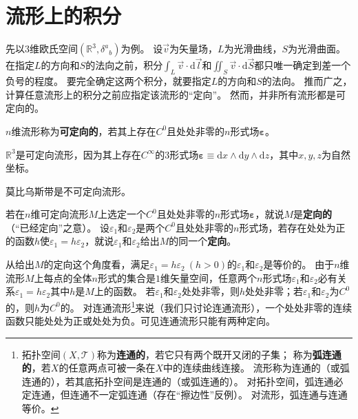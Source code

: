 \section{流形上的积分}

先以$3$维欧氏空间$(\mathbb{R}^3, \delta^a{}_{b})$为例。
设$\vec{v}$为矢量场，$L$为光滑曲线，$S$为光滑曲面。
在指定$L$的方向和$S$的法向之前，积分$\displaystyle\int_L\vec{v}\cdot\mathrm{d}\vec{l}$和$\displaystyle\iint_S\vec{v}\cdot\mathrm{d}\vec{S}$都只唯一确定到差一个负号的程度。
要完全确定这两个积分，就要指定$L$的方向和$S$的法向。
推而广之，计算任意流形上的积分之前应指定该流形的``定向''。
然而，并非所有流形都是可定向的。

\begin{definition}
    $n$维流形称为\textbf{可定向的}，若其上存在$C^0$且处处非零的$n$形式场$\bm\varepsilon$。
\end{definition}

\begin{example}
    $\mathbb{R}^3$是可定向流形，因为其上存在$C^\infty$的$3$形式场$\bm\varepsilon \equiv \mathrm{d}x \wedge \mathrm{d}y \wedge \mathrm{d}z$，其中$x, y, z$为自然坐标。
\end{example}

\begin{example}
    莫比乌斯带是不可定向流形。
\end{example}

\begin{definition}
    若在$n$维可定向流形$M$上选定一个$C^0$且处处非零的$n$形式场$\bm\varepsilon$，就说$M$是\textbf{定向的}（``已经定向''之意）。
    设$\varepsilon_1$和$\varepsilon_2$是两个$C^0$且处处非零的$n$形式场，若存在处处为正的函数$h$使$\varepsilon_1 = h\varepsilon_2$，就说$\varepsilon_1$和$\varepsilon_2$给出$M$的同一个\textbf{定向}。
\end{definition}

\begin{note}
    从给出$M$的定向这个角度看，满足$\varepsilon_1 = h\varepsilon_2 ~ (h > 0)$的$\varepsilon_1$和$\varepsilon_2$是等价的。
    由于$n$维流形$M$上每点的全体$n$形式的集合是$1$维矢量空间，任意两个$n$形式场$\varepsilon_1$和$\varepsilon_2$必有关系$\varepsilon_1 = h\varepsilon_2$其中$h$是$M$上的函数。
    若$\varepsilon_1$和$\varepsilon_2$处处非零，则$h$处处非零；若$\varepsilon_1$和$\varepsilon_2$为$C^0$的，则$h$为$C^0$的。
    对连通流形\footnote{
        拓扑空间$(X, \mathscr{T})$称为\textbf{连通的}，若它只有两个既开又闭的子集；
        称为\textbf{弧连通的}，若$X$的任意两点可被一条在$X$中的连续曲线连接。
        流形称为连通的（或弧连通的），若其底拓扑空间是连通的（或弧连通的）。
        对拓扑空间，弧连通必定连通，但连通不一定弧连通（存在``擦边性''反例）。
        对流形，弧连通与连通等价。
    }来说（我们只讨论连通流形），一个处处非零的连续函数只能处处为正或处处为负。可见连通流形只能有两种定向。
\end{note}

